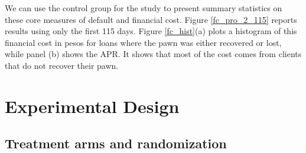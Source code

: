 \documentclass[oneside,11pt]{article}
\begin{document}
We can use the control group for the study to present summary statistics on these core measures of default and financial cost.  Figure \ref{fc_pro_2_115} reports results using only the first 115 days. Figure \ref{fc_hist}(a) plots a histogram of this financial cost in pesos for loans where the pawn was either recovered or lost, while panel (b) shows the APR. It shows that most of the cost comes from clients that do not recover their pawn. 





\section{Experimental Design} \label{Experiment}

\subsection{Treatment arms and randomization}
\end{document}
